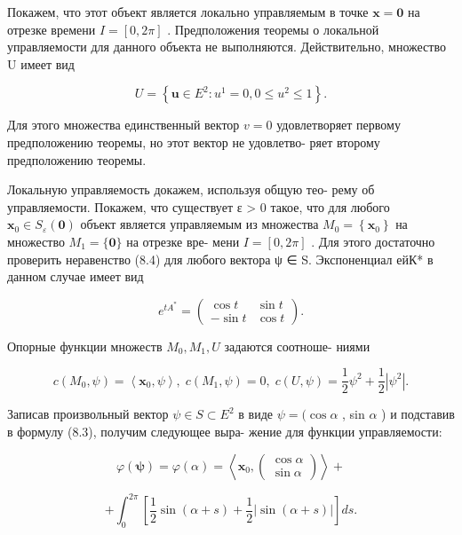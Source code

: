 \documentclass[8pt]{extarticle}
\begin{document}
Покажем, что этот объект является локально управляемым в точке \(\mathbf{x} = \mathbf{0}\) на отрезке времени \(I = \left\lbrack  {0,{2\pi }}\right\rbrack\) . Предположения теоремы о локальной управляемости для данного объекта не выполняются. Действительно, множество U имеет вид

\[
U = \left\{  {\mathbf{u} \in  {E}^{2} : {u}^{1} = 0,0 \leq  {u}^{2} \leq  1}\right\}  .
\]

Для этого множества единственный вектор \(v = 0\) удовлетворяет первому предположению теоремы, но этот вектор не удовлетво- ряет второму предположению теоремы.

Локальную управляемость докажем, используя общую тео- рему об управляемости. Покажем, что существует ε > 0 такое, что для любого \({\mathbf{x}}_{0} \in  {S}_{\varepsilon }\left( \mathbf{0}\right)\) объект является управляемым из множества \({M}_{0} = \left\{  {\mathbf{x}}_{0}\right\}\) на множество \({M}_{1} = \{ \mathbf{0}\}\) на отрезке вре- мени \(I = \left\lbrack  {0,{2\pi }}\right\rbrack\) . Для этого достаточно проверить неравенство (8.4) для любого вектора ψ ∈ S. Экспоненциал ейК* в данном случае имеет вид

\[
{e}^{t{A}^{ * }} = \left( \begin{array}{rr} \cos t & \sin t \\   - \sin t & \cos t \end{array}\right) .
\]

Опорные функции множеств \({M}_{0},{M}_{1},U\) задаются соотноше- ниями

\[
c\left( {{M}_{0},\psi }\right)  = \left\langle  {{\mathbf{x}}_{0},\psi }\right\rangle  ,\;c\left( {{M}_{1},\psi }\right)  = 0,\;c\left( {U,\psi }\right)  = \frac{1}{2}{\psi }^{2} + \frac{1}{2}\left| {\psi }^{2}\right| .
\]

Записав произвольный вектор \(\psi  \in  S \subset  {E}^{2}\) в виде \(\psi  = (\cos \alpha\) , sin \(\alpha\) ) и подставив в формулу (8.3), получим следующее выра- жение для функции управляемости:

\[
\varphi \left( \mathbf{\psi }\right)  = \varphi \left( \alpha \right)  = \left\langle  {{\mathbf{x}}_{0},\left( \begin{array}{c} \cos \alpha \\  \sin \alpha \end{array}\right) }\right\rangle   +
\]

\[
+ {\int }_{0}^{2\pi }\left\lbrack  {\frac{1}{2}\sin \left( {\alpha  + s}\right)  + \frac{1}{2}\left| {\sin \left( {\alpha  + s}\right) }\right| }\right\rbrack  {ds}.
\]
\end{document}
